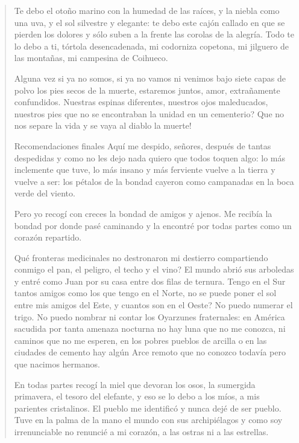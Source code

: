 \documentclass[12pt]{article}
\begin{document}
\begin{verse}
Te debo el otoño marino  
con la humedad de las raíces,  
y la niebla como una uva,  
y el sol silvestre y elegante:  
te debo este cajón callado  
en que se pierden los dolores  
y sólo suben a la frente  
las corolas de la alegría.  
Todo te lo debo a ti,  
tórtola desencadenada,  
mi codorniza copetona,  
mi jilguero de las montañas,  
mi campesina de Coihueco.  

Alguna vez si ya no somos,  
si ya no vamos ni venimos  
bajo siete capas de polvo  
los pies secos de la muerte,  
estaremos juntos, amor,  
extrañamente confundidos.  
Nuestras espinas diferentes,  
nuestros ojos maleducados,  
nuestros pies que no se encontraban  
la unidad en un cementerio?  
Que no nos separe la vida  
y se vaya al diablo la muerte!  

Recomendaciones finales  
Aquí me despido, señores,  
después de tantas despedidas  
y como no les dejo nada  
quiero que todos toquen algo:  
lo más inclemente que tuve,  
lo más insano y más ferviente  
vuelve a la tierra y vuelve a ser:  
los pétalos de la bondad  
cayeron como campanadas  
en la boca verde del viento.  

Pero yo recogí con creces  
la bondad de amigos y ajenos.  
Me recibía la bondad  
por donde pasé caminando  
y la encontré por todas partes  
como un corazón repartido.  

Qué fronteras medicinales  
no destronaron mi destierro  
compartiendo conmigo el pan,  
el peligro, el techo y el vino?  
El mundo abrió sus arboledas  
y entré como Juan por su casa  
entre dos filas de ternura.  
Tengo en el Sur tantos amigos  
como los que tengo en el Norte,  
no se puede poner el sol  
entre mis amigos del Este,  
y cuantos son en el Oeste?  
No puedo numerar el trigo.  
No puedo nombrar ni contar  
los Oyarzunes fraternales:  
en América sacudida  
por tanta amenaza nocturna  
no hay luna que no me conozca,  
ni caminos que no me esperen,  
en los pobres pueblos de arcilla  
o en las ciudades de cemento  
hay algún Arce remoto  
que no conozco todavía  
pero que nacimos hermanos.  

En todas partes recogí  
la miel que devoran los osos,  
la sumergida primavera,  
el tesoro del elefante,  
y eso se lo debo a los míos,  
a mis parientes cristalinos.  
El pueblo me identificó  
y nunca dejé de ser pueblo.  
Tuve en la palma de la mano  
el mundo con sus archipiélagos  
y como soy irrenunciable  
no renuncié a mi corazón,  
a las ostras ni a las estrellas.  


\end{verse}
\end{document}
